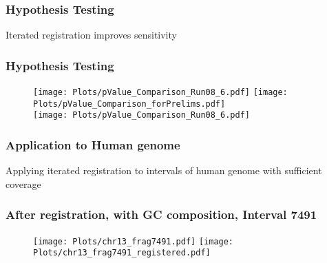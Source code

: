 \documentclass[10pt,dvipsnames,table]{beamer}
\begin{document}
\begin{frame}
\frametitle{Hypothesis Testing}
\Large
Iterated registration improves sensitivity
\end{frame}

\begin{frame}
\frametitle{Hypothesis Testing}
\vspace{-0.5cm}
\begin{figure}
\begin{center}
\texttt{[image: Plots/pValue\_Comparison\_Run08\_6.pdf]}
\hspace{2cm}
\texttt{[image: Plots/pValue\_Comparison\_forPrelims.pdf]} \\
\vspace{-1cm}
\texttt{[image: Plots/pValue\_Comparison\_Run08\_6.pdf]}
\end{center}
\end{figure}
\end{frame}

\begin{frame}
\frametitle{Application to Human genome}
\Large
Applying iterated registration to intervals of human genome with sufficient coverage
\end{frame}

\begin{frame}
\frametitle{After registration, with GC composition, Interval 7491}
\begin{figure}[t]
\texttt{[image: Plots/chr13\_frag7491.pdf]}
\texttt{[image: Plots/chr13\_frag7491\_registered.pdf]}
\end{figure}
\end{frame}
\end{document}
